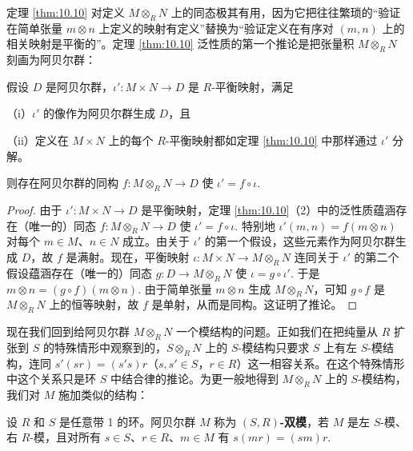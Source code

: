 定理 \ref{thm:10.10} 对定义 \(M \otimes_R N\) 上的同态极其有用，因为它把往往繁琐的“验证在简单张量 \(m \otimes n\) 上定义的映射有定义”替换为“验证定义在有序对 \((m, n)\) 上的相关映射是平衡的”。定理 \ref{thm:10.10} 泛性质的第一个推论是把张量积 \(M \otimes_R N\) 刻画为阿贝尔群：

\begin{corollary}\label{cor:10.11}
假设 \(D\) 是阿贝尔群，\(\iota' : M \times N \to D\) 是 \(R\)-平衡映射，满足

（i）\(\iota'\) 的像作为阿贝尔群生成 \(D\)，且

（ii）定义在 \(M \times N\) 上的每个 \(R\)-平衡映射都如定理 \ref{thm:10.10} 中那样通过 \(\iota'\) 分解。

则存在阿贝尔群的同构 \(f : M \otimes_R N \to D\) 使 \(\iota' = f \circ \iota\).
\end{corollary}

\begin{proof}
由于 \(\iota' : M \times N \to D\) 是平衡映射，定理 \ref{thm:10.10}（2）中的泛性质蕴涵存在（唯一的）同态 \(f : M \otimes_R N \to D\) 使 \(\iota' = f \circ \iota\). 特别地 \(\iota'(m, n) = f(m \otimes n)\) 对每个 \(m \in M\)、\(n \in N\) 成立。由关于 \(\iota'\) 的第一个假设，这些元素作为阿贝尔群生成 \(D\)，故 \(f\) 是满射。现在，平衡映射 \(\iota : M \times N \to M \otimes_R N\) 连同关于 \(\iota'\) 的第二个假设蕴涵存在（唯一的）同态 \(g : D \to M \otimes_R N\) 使 \(\iota = g \circ \iota'\). 于是 \(m \otimes n = (g \circ f)(m \otimes n)\). 由于简单张量 \(m \otimes n\) 生成 \(M \otimes_R N\)，可知 \(g \circ f\) 是 \(M \otimes_R N\) 上的恒等映射，故 \(f\) 是单射，从而是同构。这证明了推论。
\end{proof}

现在我们回到给阿贝尔群 \(M \otimes_R N\) 一个模结构的问题。正如我们在把纯量从 \(R\) 扩张到 \(S\) 的特殊情形中观察到的，\(S \otimes_R N\) 上的 \(S\)-模结构只要求 \(S\) 上有左 \(S\)-模结构，连同 \(s'(sr) = (s's)r\)（\(s, s' \in S\)，\(r \in R\)）这一相容关系。在这个特殊情形中这个关系只是环 \(S\) 中结合律的推论。为更一般地得到 \(M \otimes_R N\) 上的 \(S\)-模结构，我们对 \(M\) 施加类似的结构：

\begin{definition}
设 \(R\) 和 \(S\) 是任意带 1 的环。阿贝尔群 \(M\) 称为 \textbf{\((S, R)\)-双模}，若 \(M\) 是左 \(S\)-模、右 \(R\)-模，且对所有 \(s \in S\)、\(r \in R\)、\(m \in M\) 有 \(s(mr) = (sm)r\).
\end{definition}

